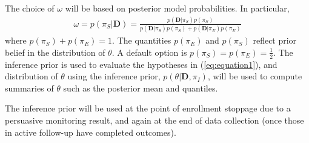 \documentclass[12pt]{article}
\begin{document}
The choice of $\omega$ will be based on posterior model probabilities. In particular,
\begin{align}\label{eq:omega_formula}
\omega=p(\pi_S|\mathbf{D})=\frac{p(\mathbf{D}|\pi_S)p(\pi_S)}{p(\mathbf{D}|\pi_S)p(\pi_S)+p(\mathbf{D}|\pi_E)p(\pi_E)}
\end{align}
where $p(\pi_S)+p(\pi_E)=1$. The quantities $p(\pi_E)$ and $p(\pi_S)$ reflect prior belief in the distribution of $\theta$. A default option is $p(\pi_S)=p(\pi_E)=\frac{1}{2}$. The inference prior is used to evaluate the hypotheses in (\ref{eq:equation1}), and distribution of $\theta$ using the inference prior, $p(\theta|\mathbf{D},\pi_I)$, will be used to compute summaries of $\theta$ such as the posterior mean and quantiles.

The inference prior will be used at the point of enrollment stoppage due to a persuasive monitoring result, and again at the end of data collection (once those in active follow-up have completed outcomes).
\end{document}
